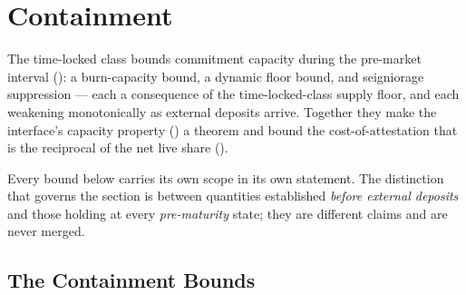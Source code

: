 \documentclass[../main.tex]{subfiles}
\begin{document}
%
%
%

\section{Containment}
\label{sec:attestation:containment}

The time-locked class bounds commitment capacity during the pre-market interval
(): a burn-capacity bound, a dynamic floor bound, and
seigniorage suppression --- each a consequence of the time-locked-class supply floor, and
each weakening monotonically as external deposits arrive. Together they make the interface's
capacity property () a theorem and bound the
cost-of-attestation that is the reciprocal of the net live share
().

Every bound below carries its own scope in its own statement. The distinction that governs
the section is between quantities established \emph{before external deposits} and those
holding at every \emph{pre-maturity} state; they are different claims and are never
merged.

\subsection{The Containment Bounds}
\label{sec:containment:bounds}
\end{document}
